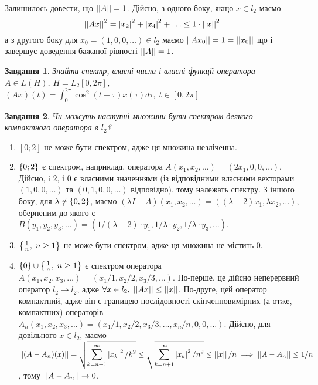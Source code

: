 \documentclass[10pt]{article}
\newtheorem{prob}{Завдання}
\begin{document}
	Залишилось довести, що $\left|\left|A\right|\right|=1$. Дійсно, з одного боку, якщо $x\in l_2$ маємо
	\[\left|\left|Ax\right|\right|^2=\left|x_2\right|^2+\left|x_4\right|^2+\hdots\leq1\cdot\left|\left|x\right|\right|^2\]
	а з другого боку для $x_0=(1,0,0,\hdots)\in l_2$ маємо
	$\left|\left|Ax_0\right|\right|=1=\left|\left|x_0\right|\right|$
	що і завершує доведення бажаної рівності $\left|\left|A\right|\right|=1$.
\begin{prob}Знайти спектр, власні числа і власні функції оператора $A\in L(H)$, $H=L_2[0,2\pi]$, $(Ax)(t)=\int_0^{2\pi}\cos^2(t+\tau)x(\tau)
	d\tau,\;t\in[0,2\pi]$
\end{prob}
\begin{prob}Чи можуть наступні множини бути спектром деякого компактного оператора в $l_2$?\end{prob}
\begin{enumerate}
	\renewcommand{\labelenumi}{\myralph{enumi})}
\item $[0;2]$ \uline{не може} бути спектром, адже ця множина незліченна.
\item $\left\{0;2\right\}$ є спектром, наприклад, оператора $A(x_1,x_2,\hdots)=(2x_1,0,0,\hdots)$. Дійсно, i 2, і 0 є власними значеннями (із відповідними
	власними векторами $(1,0,0,\hdots)$ та $(0,1,0,0,\hdots)$ відповідно), тому належать спектру. З іншого боку, для $\lambda\notin\left\{0,2\right\}$,
	маємо $(\lambda I-A)(x_1,x_2,\hdots)=((\lambda-2)x_1,\lambda x_2,\hdots)$, оберненим до якого є 
	$B(y_1,y_2,y_3,\hdots)=(1/(\lambda-2)\cdot y_1,1/\lambda\cdot y_2,1/\lambda\cdot y_3,\hdots)$.
\item $\left\{\frac{1}{n},\;n\geq1\right\}$ \uline{не може} бути спектром, адже ця множина не містить 0.
\item $\left\{0\right\}\cup\left\{\frac{1}{n},\;n\geq1\right\}$ є спектром оператора $A(x_1,x_2,x_3,\hdots)=(x_1/1,x_2/2,x_3/3,\hdots)$. По-перше, це дійсно
	неперервний оператор $l_2\to l_2$, адже $\forall x\in l_2,\;\left|\left|Ax\right|\right|\leq\left|\left|x\right|\right|$. По-друге, цей оператор компактний, адже він
	є границею послідовності скінченновимірних (а отже, компактних) операторів $A_n(x_1,x_2,x_3,\hdots)=(x_1/1,x_2/2,x_3/3,\hdots,x_n/n,0,0,
	\hdots)$. Дійсно, для довільного $x\in l_2$, маємо $\mynorm{(A-A_n)(x)}=\sqrt{\sum_{k=n+1}^{\infty}\myabs{x_k}^2/k
	^2}\leq\sqrt{\sum_{k=n+1}^{\infty}\myabs{x_k}^2/n^2}\leq\mynorm{x}/n\implies\mynorm{A-A_n}\leq 1/n$, тому $\left|\left|A-A_n\right|\right|\to0$.


\end{enumerate}
\end{document}
